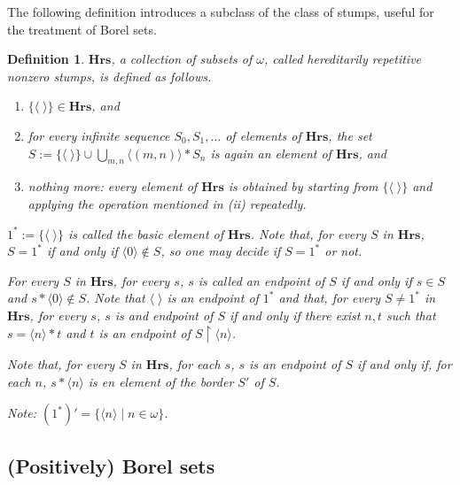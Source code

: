 \documentclass[a4paper]{amsart}
\theoremstyle{plain}
\newtheorem{definition}{Definition}
\begin{document}
The following definition introduces a subclass of the class of stumps,  useful for the treatment of Borel sets.

\begin{definition} $\mathbf{Hrs}$,  a collection  of  subsets of $\omega$, called \emph{hereditarily repetitive nonzero stumps}, is defined as follows. 

\begin{enumerate}[\upshape (i)]
\item $\{\langle\;\rangle\} \in \mathbf{Hrs}$, and
\item for every infinite sequence $S_0, S_1, \ldots$ of elements of $\mathbf{Hrs}$,  the set \\$S:= \{\langle \;\rangle\}\cup\bigcup\limits_{m, n }
\langle (m, n)\rangle \ast S_n$ is again an element of $\mathbf{Hrs}$, and
\item nothing more: every element of $\mathbf{Hrs}$ is obtained by starting from $\{\langle\;\rangle\}$ and applying the operation mentioned in (ii) repeatedly.
\end{enumerate}

\smallskip $1^\ast:=\{\langle\;\rangle\}$ is called the \emph{basic element of} $\mathbf{Hrs}$. Note that, for every $S$ in $\mathbf{Hrs}$, $S=1^\ast$ if and only if $\langle 0 \rangle \notin S$, so one may decide if $S=1^\ast$ or not. 

\smallskip For every $S$ in $\mathbf{Hrs}$, for every $s$, $s$ is called an \emph{endpoint of $S$} if and only if $s\in S$ and $s\ast\langle 0 \rangle \notin S$. Note that $\langle\;\rangle$ is an endpoint of $1^\ast$ and that, for every  $S\ne 1^\ast$ in $\mathbf{Hrs}$, for every $s$, $s$ is and endpoint of $S$ if and only if there exist $n,t$ such that $s=\langle n \rangle\ast t$ and $t$ is an endpoint of $S\upharpoonright\langle n \rangle$.

\smallskip Note that, for every $S$ in $\mathbf{Hrs}$, for each $s$, $s$ is an endpoint of $S$ if and only if, for each $n$, $s\ast\langle n \rangle$ is en element of the border $S'$ of $S$.

\smallskip  Note: $(1^\ast)' = \{\langle n \rangle \mid n \in \omega\}$. 

\end{definition}


\subsection{(Positively) Borel sets}
\end{document}
